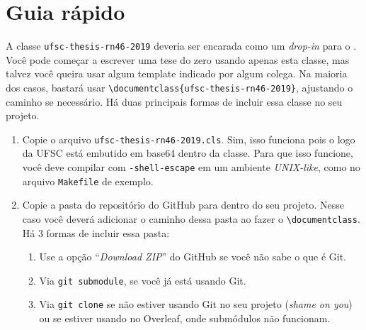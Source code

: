 \documentclass[embeddedlogo]{ufsc-thesis-rn46-2019}
\newcommand{\lacmd}[1]{\texttt{\textbackslash{}#1}}
\begin{document}
\section{Guia rápido}
\label{sec:quick}

A classe \texttt{ufsc-thesis-rn46-2019} deveria ser encarada como um
\emph{drop-in} para o \abnTeX. Você pode começar a escrever uma tese do zero
usando apenas esta classe, mas talvez você queira usar algum template indicado
por algum colega. Na maioria dos casos, bastará usar
\lacmd{documentclass\{ufsc-thesis-rn46-2019\}}, ajustando o caminho se necessário.
Há duas principais formas de incluir essa classe no seu projeto.

\begin{enumerate}
  \item Copie o arquivo \texttt{ufsc-thesis-rn46-2019.cls}. Sim, isso funciona
      pois o logo da UFSC está embutido em base64 dentro da classe. Para que
        isso funcione, você deve compilar com \texttt{-shell-escape} em um
        ambiente \textit{UNIX-like}, como no arquivo \texttt{Makefile} de
        exemplo.
  \item Copie a pasta do repositório do GitHub para dentro do seu projeto.
      Nesse caso você deverá adicionar o caminho dessa pasta ao fazer o
        \lacmd{documentclass}. Há 3 formas de incluir essa pasta:
  \begin{enumerate}
    \item Use a opção ``\emph{Download ZIP}'' do GitHub se você não sabe o que
        é Git.
    \item Via \texttt{git submodule}, se você já está usando Git.
    \item Via \texttt{git clone} se não estiver usando Git no seu projeto
        (\emph{shame on you}) ou se estiver usando no Overleaf, onde submódulos
          não funcionam.
    \end{enumerate}
\end{enumerate}
\end{document}
